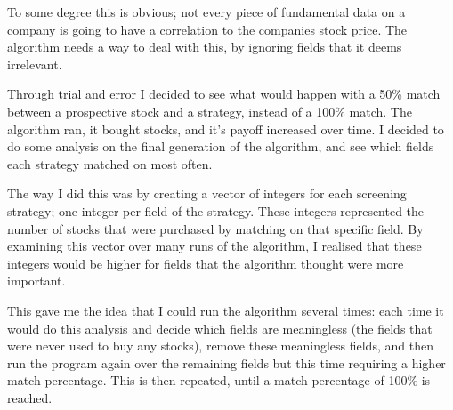 To some degree this is obvious; not every piece of fundamental data on a company is going to have a correlation to the companies stock price. The algorithm needs a way to deal with this, by ignoring fields that it deems irrelevant. \newline

Through trial and error I decided to see what would happen with a 50\% match between a prospective stock and a strategy, instead of a 100\% match. The algorithm ran, it bought stocks, and it's payoff increased over time. I decided to do some analysis on the final generation of the algorithm, and see which fields each strategy matched on most often. \newline

The way I did this was by creating a vector of integers for each screening strategy; one integer per field of the strategy. These integers represented the number of stocks that were purchased by matching on that specific field. By examining this vector over many runs of the algorithm, I realised that these integers would be higher for fields that the algorithm thought were more important. \newline

This gave me the idea that I could run the algorithm several times: each time it would do this analysis and decide which fields are meaningless (the fields that were never used to buy any stocks), remove these meaningless fields, and then run the program again over the remaining fields but this time requiring a higher match percentage. This is then repeated, until a match percentage of 100\% is reached.

